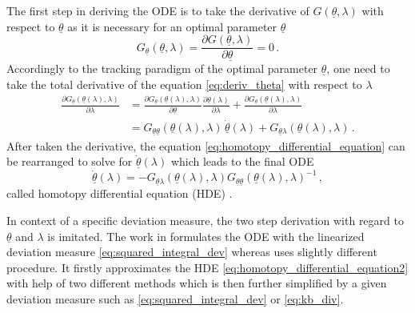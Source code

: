 \documentclass[a4paper]{IEEEtran}
\begin{document}
The first step in deriving the ODE is to take the derivative of $G(\underline{\theta},\lambda)$ with respect to $\underline{\theta}$ as it is necessary for an optimal parameter $\underline{\theta}$
\begin{equation}
    G_{\underline{\theta}}(\underline{\theta}, \lambda) = \frac{\partial G(\underline{\theta}, \lambda)}{\partial \underline{\theta}} = 0 \,.
    \label{eq:deriv_theta}
\end{equation}
Accordingly to the tracking paradigm of the optimal parameter $\underline{\theta}$, one need to take the total derivative of the equation \eqref{eq:deriv_theta} with respect to $\lambda$
\begin{equation}
    \begin{split}
        \frac{\partial G_{\underline{\theta}}(\underline{\theta}(\lambda),\lambda)}{\partial \lambda} &= \frac{\partial G_{\underline{\theta}}(\underline{\theta}(\lambda),\lambda)}{\partial \underline{\theta}} \frac{\partial \underline{\theta}(\lambda)}{\partial \lambda} + \frac{\partial G_{\underline{\theta}}(\underline{\theta}(\lambda),\lambda)}{\partial \lambda} \\
        &= G_{\underline{\theta}\underline{\theta}}(\underline{\theta}(\lambda),\lambda) \, \underline{\dot{\theta}}(\lambda) + G_{\underline{\theta}\lambda}(\underline{\theta}(\lambda),\lambda) \,.
    \end{split}
    \label{eq:homotopy_differential_equation}
\end{equation}
After taken the derivative, the equation \eqref{eq:homotopy_differential_equation} can be rearranged to solve for $\underline{\dot{\theta}}(\lambda)$ which leads to the final ODE
\begin{equation}
    \underline{\dot{\theta}}(\lambda) = - G_{\underline{\theta}\lambda}(\underline{\theta}(\lambda),\lambda) G_{\underline{\theta}\underline{\theta}}(\underline{\theta}(\lambda),\lambda)^{-1} \,,
    \label{eq:homotopy_differential_equation2}
\end{equation}
called homotopy differential equation (HDE) \cite{hagmar2011}.

In context of a specific deviation measure, the two step derivation with regard to $\underline{\theta}$ and $\lambda$ is imitated. The work in \cite{hanebeck2003} formulates the ODE with the linearized deviation measure \eqref{eq:squared_integral_dev} whereas \cite{hagmar2011} uses slightly different
procedure. It firstly approximates the HDE \eqref{eq:homotopy_differential_equation2} with help of two different methods which is then further simplified
by a given deviation measure such as \eqref{eq:squared_integral_dev} or \eqref{eq:kb_div}. 
\end{document}

